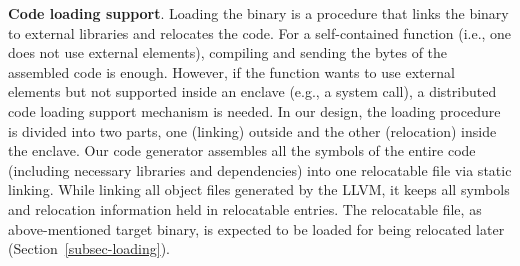 \vspace{3pt}\noindent\textbf{Code loading support}.\label{subsec:code-loading-support}
Loading the binary is a procedure that links the binary to external libraries and relocates the code. 
For a self-contained function (i.e., one does not use external elements), compiling and sending the bytes of the assembled code is enough. However, if the function wants to use external elements but not supported inside an enclave (e.g., a system call), a distributed code loading support mechanism is needed. In our design, the loading procedure is divided into two parts, one (linking) outside and the other (relocation) inside the enclave.
Our code generator assembles all the symbols of the entire code (including necessary libraries and dependencies) into one relocatable file via static linking. While linking all object files generated by the LLVM, it keeps all symbols and relocation information held in relocatable entries. 
The relocatable file, as above-mentioned target binary, is expected to be loaded for being relocated later (Section~\ref{subsec-loading}).






